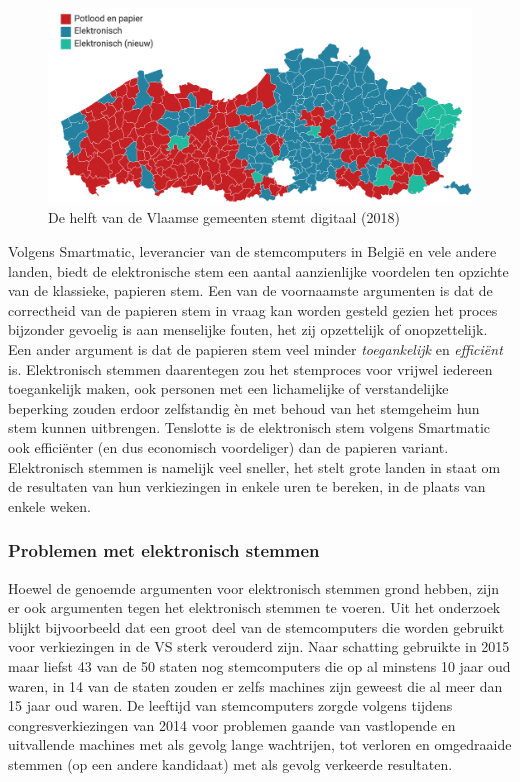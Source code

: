 			\begin{figure}
				\includegraphics[width=\linewidth]{img/evote_vlaanderen.png}
				\caption{De helft van de Vlaamse gemeenten stemt digitaal (2018)}
				\label{fig:evote_vlaanderen}
			\end{figure}
			
			Volgens Smartmatic, leverancier van de stemcomputers in België en vele andere landen, biedt de elektronische stem een aantal aanzienlijke voordelen ten opzichte van de klassieke, papieren stem. Een van de voornaamste argumenten is dat de correctheid van de papieren stem in vraag kan worden gesteld gezien het proces bijzonder gevoelig is aan menselijke fouten, het zij opzettelijk of onopzettelijk. Een ander argument is dat de papieren stem veel minder \textit{toegankelijk} en \textit{efficiënt} is. Elektronisch stemmen daarentegen zou het stemproces voor vrijwel iedereen toegankelijk maken, ook personen met een lichamelijke of verstandelijke beperking zouden erdoor zelfstandig èn met behoud van het stemgeheim hun stem kunnen uitbrengen. Tenslotte is de elektronisch stem volgens Smartmatic ook efficiënter (en dus economisch voordeliger) dan de papieren variant. Elektronisch stemmen is namelijk veel sneller, het stelt grote landen in staat om de resultaten van hun verkiezingen in enkele uren te bereken, in de plaats van enkele weken.
			
			\subsubsection{Problemen met elektronisch stemmen}
			Hoewel de genoemde argumenten voor elektronisch stemmen grond hebben, zijn er ook argumenten tegen het elektronisch stemmen te voeren. Uit het onderzoek \cite{Norden2015} blijkt bijvoorbeeld dat een groot deel van de stemcomputers die worden gebruikt voor verkiezingen in de VS sterk verouderd zijn. Naar schatting gebruikte in 2015 maar liefst 43 van de 50 staten nog stemcomputers die op al minstens 10 jaar oud waren, in 14 van de staten zouden er zelfs machines zijn geweest die al meer dan 15 jaar oud waren. De leeftijd van stemcomputers zorgde volgens \cite{Norden2015} tijdens  congresverkiezingen van 2014 voor problemen gaande van vastlopende en uitvallende machines met als gevolg  lange wachtrijen, tot verloren en omgedraaide stemmen (op een andere kandidaat) met als gevolg verkeerde resultaten.
			
